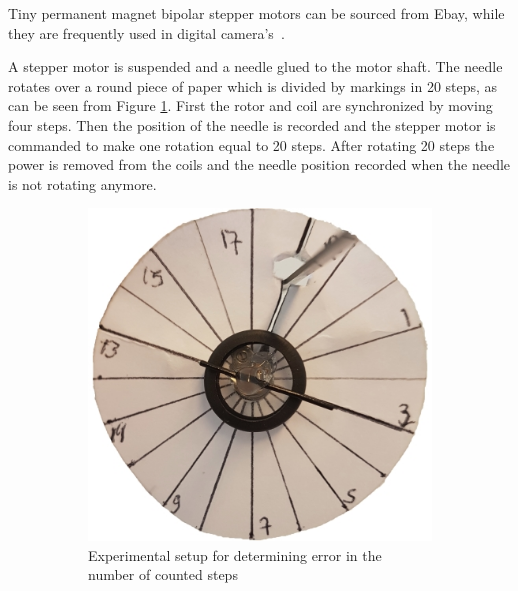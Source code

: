 Tiny permanent magnet bipolar stepper motors can be sourced from Ebay, while they are frequently used in digital camera's~\cite{nidec_stepper_2017}.

A stepper motor is suspended and a needle glued to the motor shaft.
The needle rotates over a round piece of paper which is divided by markings in 20 steps, as can be seen from Figure \ref{fig:step_counting}.
First the rotor and coil are synchronized by moving four steps.
Then the position of the needle is recorded and the stepper motor is commanded to make one rotation equal to 20 steps.
After rotating 20 steps the power is removed from the coils and the needle position recorded when the needle is not rotating anymore.

\begin{figure}
	\centering
	\begin{subfigure}[b]{0.38\textwidth}
		\includegraphics[width=\textwidth]{pics/step_counting.jpg}
		\caption{Experimental setup for determining error in the number of counted steps}
		\label{fig:step_counting}
	\end{subfigure}	
	\quad
	\begin{subfigure}[b]{0.55\textwidth}

\end{subfigure}
\end{figure}
